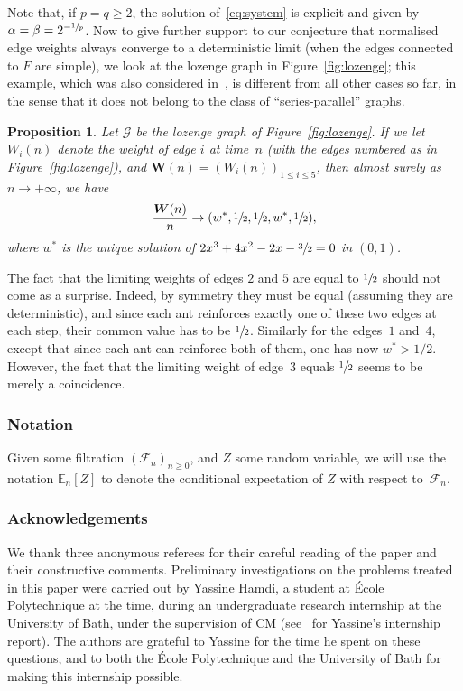 \documentclass[10pt]{amsart}
\let\mathcal\mathscr
\let \nicefrac\sfrac
\newcommand{\bW}{\boldsymbol{W}}
\numberwithin{equation}{section}
\newtheorem{proposition}[theorem]{Proposition}
\theoremstyle{definition}
\begin{document}
Note that, if $p=q\geq 2$, the solution of~\eqref{eq:system}
is explicit and given by $\alpha = \beta = 2^{-\nicefrac1p}$. Now to give further support to our conjecture that normalised edge weights always converge to a deterministic limit (when the edges connected to $F$ are simple), we look at the lozenge graph in Figure~\ref{fig:lozenge}; this example, which was also considered in~\cite{KMS},
is different from all other cases so far, in the sense that it does not belong to the class of ``series-parallel'' graphs.
\begin{proposition}\label{prop:lozenge}
Let $\mathcal G$ be the lozenge graph of Figure~\ref{fig:lozenge}. If we let $W_i(n)$ denote the weight of edge $i$ at time~$n$ (with the edges numbered as in Figure~\ref{fig:lozenge}), and $\bW(n) = (W_i(n))_{1\leq i\leq 5}$, then almost surely as $n\to+\infty$, we have
\[
\frac{\bW(n)}{n} \to (w^*, \nicefrac12, \nicefrac12, w^*, \nicefrac12),
\]
where $w^*$ is the unique solution of $2x^3+4x^2-2x-\nicefrac32 = 0$ in $(0,1)$.
\end{proposition}
{The fact that the limiting weights of edges $2$ and $5$ are equal to $\nicefrac12$ should not come as a surprise. Indeed, by symmetry they must be equal (assuming they are deterministic),
and since each ant reinforces exactly one of these two edges at each step, their common value has to be $\nicefrac12$.
Similarly for the edges~$1$ and~$4$, except that since each ant can reinforce both of them,
one has now $w^*>1/2$.
However, the fact that the limiting weight of edge~$3$ equals $\nicefrac12$ seems to be merely a coincidence.}

\subsubsection*{Notation} Given some filtration $(\mathcal F_n)_{n\ge 0}$, and $Z$ some random variable, we will use the notation $\mathbb E_n[Z]$ to denote the conditional expectation of $Z$ with respect to~$\mathcal F_n$.

\subsubsection*{Acknowledgements}
We thank three anonymous referees for their careful reading of the paper and their constructive comments.
Preliminary investigations on the problems treated in this paper were carried out by Yassine Hamdi,
a student at École Polytechnique at the time,
during an undergraduate research internship at the University of Bath,
under the supervision of CM (see~\cite{Yassine} for Yassine's internship report).
The authors are grateful to Yassine for the time he spent on these questions,
and to both the École Polytechnique and the University of Bath for making this internship possible.
\end{document}
